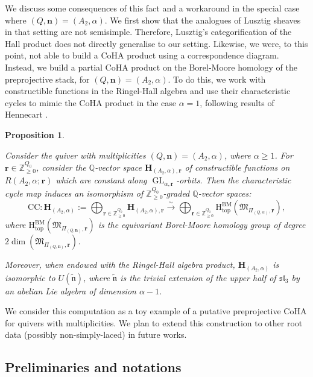 \documentclass[11pt,english]{article}
\numberwithin{equation}{section}
\numberwithin{figure}{section}
\theoremstyle{definition}
\theoremstyle{plain}
\newtheorem{propintro}[thmintro]{Proposition}
\theoremstyle{remark}
\DeclareMathOperator{\GL}{GL}
\newcommand\nn{\mathbf{n}}
\newcommand\rr{\mathbf{r}}
\newcommand\HH{\mathrm{H}}
\newcommand\ZZ{\mathbb{Z}}
\newcommand\QQ{\mathbb{Q}}
\begin{document}
We discuss some consequences of this fact and a workaround in the
special case where $(Q,\nn)=(A_{2},\alpha)$. We first show that the
analogues of Lusztig sheaves in that setting are not semisimple. Therefore,
Lusztig's categorification of the Hall product does not directly generalise
to our setting. Likewise, we were, to this point, not able to build
a CoHA product using a correspondence diagram. Instead, we build a
partial CoHA product on the Borel-Moore homology of the preprojective
stack, for $(Q,\nn)=(A_{2},\alpha)$. To do this, we work with constructible
functions in the Ringel-Hall algebra and use their characteristic
cycles to mimic the CoHA product in the case $\alpha=1$, following
results of Hennecart \cite{Hen24}.

\begin{propintro} \label{Prop/IntroTopCoHA}

Consider the quiver with multiplicities $(Q,\nn)=(A_{2},\alpha)$,
where $\alpha\geq1$. For $\rr\in\ZZ_{\geq0}^{Q_{0}}$, consider the
$\QQ$-vector space $\mathbf{H}_{(A_{2},\alpha),\rr}$ of constructible
functions on $R(A_{2},\alpha;\rr)$ which are constant along $\GL_{\alpha,\rr}$-orbits.
Then the characteristic cycle map induces an isomorphism of $\ZZ_{\geq0}^{Q_{0}}$-graded
$\QQ$-vector spaces:\[
\mathrm{CC}:
\mathbf{H}_{(A_2,\alpha)}:=\bigoplus_{\rr\in\ZZ_{\geq0}^{Q_0}}\mathbf{H}_{(A_2,\alpha),\rr}
\overset{\sim}{\longrightarrow}
\bigoplus_{\rr\in\ZZ_{\geq0}^{Q_0}}\HH_{\mathrm{top}}^{\mathrm{BM}}\left(\mathfrak{M}_{\Pi_{(Q,\alpha)},\rr}\right)
,
\]where $\HH_{\mathrm{top}}^{\mathrm{BM}}\left(\mathfrak{M}_{\Pi_{(Q,\nn)},\rr}\right)$
is the equivariant Borel-Moore homology group of degree $2\dim\left(\mathfrak{M}_{\Pi_{(Q,\nn)},\rr}\right)$.

Moreover, when endowed with the Ringel-Hall algebra product, $\mathbf{H}_{(A_{2},\alpha)}$
is isomorphic to $U(\tilde{\mathfrak{n}})$, where $\tilde{\mathfrak{n}}$
is the trivial extension of the upper half of $\mathfrak{sl}_{3}$
by an abelian Lie algebra of dimension $\alpha-1$.

\end{propintro}

We consider this computation as a toy example of a putative preprojective
CoHA for quivers with multiplicities. We plan to extend this construction
to other root data (possibly non-simply-laced) in future works.

\subsection*{Preliminaries and notations}
\end{document}
